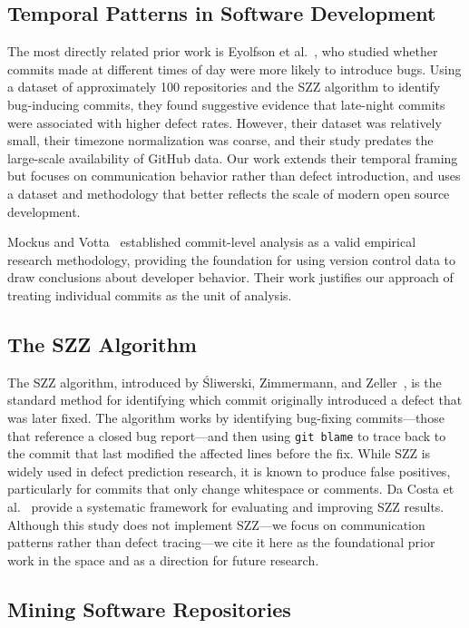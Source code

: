 \documentclass[sigconf]{acmart}
\begin{document}
\subsection{Temporal Patterns in Software Development}

The most directly related prior work is Eyolfson et al.~\cite{eyolfson2011}, who studied whether commits made at different times of day were more likely to introduce bugs. Using a dataset of approximately 100 repositories and the SZZ algorithm to identify bug-inducing commits, they found suggestive evidence that late-night commits were associated with higher defect rates. However, their dataset was relatively small, their timezone normalization was coarse, and their study predates the large-scale availability of GitHub data. Our work extends their temporal framing but focuses on communication behavior rather than defect introduction, and uses a dataset and methodology that better reflects the scale of modern open source development.

Mockus and Votta~\cite{mockus2000} established commit-level analysis as a valid empirical research methodology, providing the foundation for using version control data to draw conclusions about developer behavior. Their work justifies our approach of treating individual commits as the unit of analysis.

\subsection{The SZZ Algorithm}

The SZZ algorithm, introduced by Śliwerski, Zimmermann, and Zeller~\cite{sliwerski2005}, is the standard method for identifying which commit originally introduced a defect that was later fixed. The algorithm works by identifying bug-fixing commits---those that reference a closed bug report---and then using \texttt{git blame} to trace back to the commit that last modified the affected lines before the fix. While SZZ is widely used in defect prediction research, it is known to produce false positives, particularly for commits that only change whitespace or comments. Da Costa et al.~\cite{dacosta2017} provide a systematic framework for evaluating and improving SZZ results. Although this study does not implement SZZ---we focus on communication patterns rather than defect tracing---we cite it here as the foundational prior work in the space and as a direction for future research.

\subsection{Mining Software Repositories}
\end{document}
